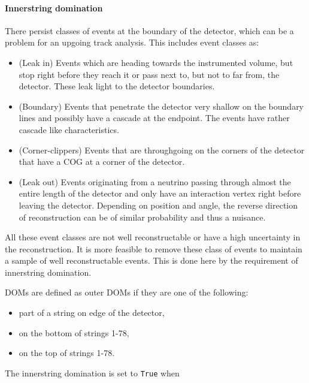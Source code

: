 \paragraph{Innerstring domination}
There persist classes of events at the boundary of the detector, which can be a problem for an upgoing track analysis. This includes event classes as:

\vspace{2mm}
\begin{itemize}
\item (Leak in) Events which are heading towards the instrumented volume, but stop right before they reach it or pass next to, but not to far from, the detector. These leak light to the detector boundaries.
\item (Boundary) Events that penetrate the detector very shallow on the boundary lines and possibly have a cascade at the endpoint. The events have rather cascade like characteristics.
\item (Corner-clippers) Events that are throughgoing on the corners of the detector that have a COG at a corner of the detector.
\item (Leak out) Events originating from a neutrino passing through almost the entire length of the detector and only have an interaction vertex right before leaving the detector. Depending on position and angle, the reverse direction of reconstruction can be of similar probability and thus a nuisance.
\end{itemize}
\vspace{2mm}

\noindent All these event classes are not well reconstructable or have a high uncertainty in the reconstruction. It is more feasible to remove these class of events to maintain a sample of well reconstructable events. This is done here by the requirement of innerstring domination.

DOMs are defined as outer DOMs if they are one of the following:

\vspace{2mm}
\begin{itemize}
\item part of a string on edge of the detector,
\item on the bottom of strings 1-78,
\item on the top of strings 1-78.
\end{itemize}
\vspace{2mm}

\noindent The innerstring domination is set to \texttt{True} when 


